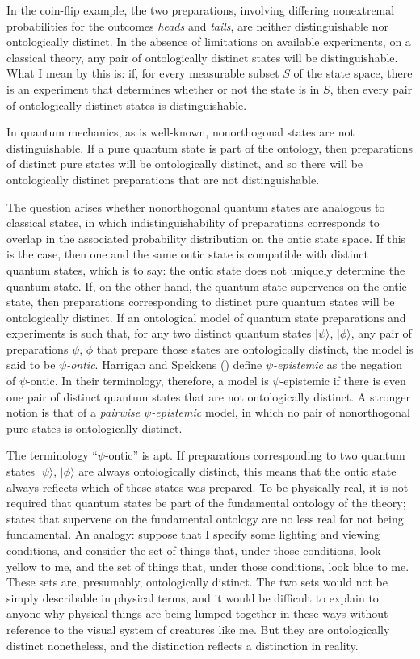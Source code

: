 \documentclass[12pt]{article}
\newcommand{\ket}[1]{|#1\rangle}
\begin{document}
In the coin-flip example, the two preparations, involving differing nonextremal probabilities for the outcomes \emph{heads} and \emph{tails}, are neither distinguishable nor ontologically distinct.  In the absence of limitations on available experiments, on a classical theory, any pair of ontologically distinct states will be distinguishable. What I mean by this is: if, for every measurable subset $S$ of the state space, there is an experiment that determines whether or not the state is in $S$, then every pair of ontologically distinct states is distinguishable.

In quantum mechanics, as is well-known, nonorthogonal states are not distinguishable.  If a pure quantum state is part of the ontology, then preparations of distinct pure states will be ontologically distinct, and so there will be ontologically distinct preparations that are not distinguishable.

The question arises whether nonorthogonal quantum states are analogous to classical states, in which indistinguishability of preparations corresponds to overlap in the associated probability distribution on the ontic state space.  If this is the case, then one and the same ontic state is compatible with distinct quantum states, which is to say: the ontic state does not uniquely determine the quantum state.  If, on the other hand,  the quantum state supervenes on the ontic state, then preparations corresponding to distinct pure quantum states will be ontologically distinct.  If an ontological model of quantum state preparations and experiments  is such that, for any two distinct quantum states $\ket{\psi}$, $\ket{\phi}$,  any pair of preparations $\psi$, $\phi$ that prepare those states are ontologically distinct, the model is said to be \emph{$\psi$-ontic}.  Harrigan and Spekkens  (\citeyear{SpekkensHarrigan}) define \emph{$\psi$-epistemic} as the negation of $\psi$-ontic.  In their terminology, therefore, a model is $\psi$-epistemic if there is even one pair of distinct quantum states that are not ontologically distinct.  A stronger notion is that of a \emph{pairwise $\psi$-epistemic} model, in which no pair of nonorthogonal pure states is ontologically distinct.

The terminology ``$\psi$-ontic'' is apt.   If preparations corresponding to two quantum states $\ket{\psi}$, $\ket{\phi}$ are always ontologically distinct, this means that the ontic state always reflects which of these states was prepared. To be physically real, it is not required that quantum states  be part of the fundamental ontology of the theory; states that supervene on the fundamental ontology are no less real for not being fundamental. An analogy: suppose that I specify some lighting and viewing conditions, and consider the set of things that, under those conditions, look yellow to me, and the set of things that, under those conditions, look blue to me.  These sets are, presumably, ontologically distinct. The two sets would not be simply describable in physical terms, and it would be difficult to explain to anyone why physical things are being lumped together in these ways without reference to the visual system of creatures like me. But they are ontologically distinct nonetheless, and the distinction reflects a distinction in reality.
\end{document}
